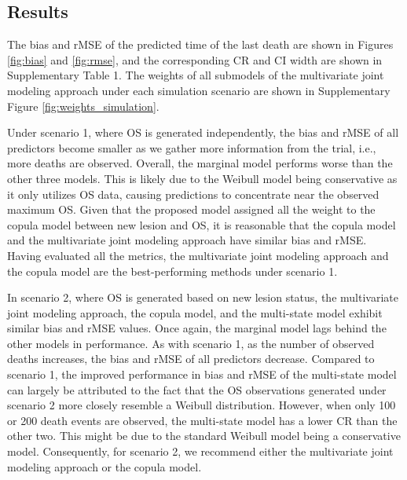 \documentclass[aoas]{imsart}
\theoremstyle{plain}
\theoremstyle{remark}
\begin{document}
\subsection{Results}

The bias and rMSE of the predicted time of the last death are shown in Figures \ref{fig:bias} and \ref{fig:rmse}, and the corresponding CR and CI width are shown in Supplementary Table 1. The weights of all submodels of the multivariate joint modeling approach under each simulation scenario are shown in Supplementary Figure \ref{fig:weights_simulation}.

Under scenario 1, where OS is generated independently, the bias and rMSE of all predictors become smaller as we gather more information from the trial, i.e., more deaths are observed. Overall, the marginal model performs worse than the other three models. This is likely due to the Weibull model being conservative as it only utilizes OS data, causing predictions to concentrate near the observed maximum OS. Given that the proposed model assigned all the weight to the copula model between new lesion and OS, it is reasonable that the copula model and the multivariate joint modeling approach have similar bias and rMSE. Having evaluated all the metrics, the multivariate joint modeling approach and the copula model are the best-performing methods under scenario 1.

In scenario 2, where OS is generated based on new lesion status, the multivariate joint modeling approach, the copula model, and the multi-state model exhibit similar bias and rMSE values. Once again, the marginal model lags behind the other models in performance. As with scenario 1, as the number of observed deaths increases, the bias and rMSE of all predictors decrease. Compared to scenario 1, the improved performance in bias and rMSE of the multi-state model can largely be attributed to the fact that the OS observations generated under scenario 2 more closely resemble a Weibull distribution. However, when only 100 or 200 death events are observed, the multi-state model has a lower CR than the other two. This might be due to the standard Weibull model being a conservative model. Consequently, for scenario 2, we recommend either the multivariate joint modeling approach or the copula model.
\end{document}
